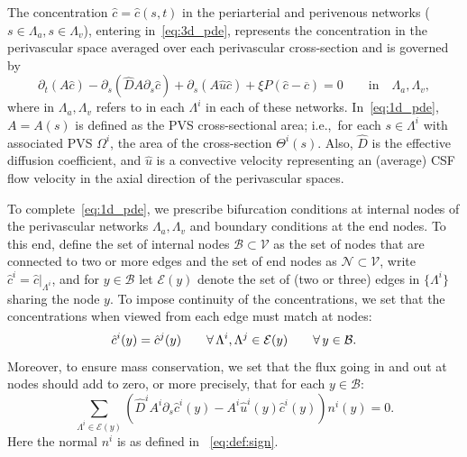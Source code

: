 \documentclass[fleqn,10pt]{wlscirep}
\begin{document}
The concentration $\hat{c} = \hat{c}(s, t)$ in the periarterial and
perivenous networks ($s \in \Lambda_a, s \in \Lambda_v$), entering
in~\eqref{eq:3d_pde}, represents the concentration in the perivascular
space averaged over each perivascular cross-section and is governed by 
\begin{equation}
  \partial_t (A  \hat c) - \partial_s( \hat D A \partial_s \hat c  ) + \partial_s(A \hat u \hat c )  +  \xi P (\hat c - \overline{c}) = 0
  \qquad \text{in} \quad \Lambda_a, \Lambda_v ,
\label{eq:1d_pde}
\end{equation}
where in $\Lambda_a, \Lambda_v$ refers to in each $\Lambda^i$ in each
of these networks. In~\eqref{eq:1d_pde}, $A = A(s)$ is defined as the
PVS cross-sectional area; i.e.,~for each $s \in \Lambda^i$ with
associated PVS $\Omega^i$, the area of the cross-section
$\Theta^i(s)$. Also, $\hat{D}$ is the effective diffusion coefficient,
and $\hat{u}$ is a convective velocity representing an (average) CSF
flow velocity in the axial direction of the perivascular spaces.

To complete~\eqref{eq:1d_pde}, we prescribe bifurcation conditions at
internal nodes of the perivascular networks $\Lambda_a, \Lambda_v$ and
boundary conditions at the end nodes. To this end, define the set of
internal nodes $\mathcal{B} \subset \mathcal{V}$ as the set of nodes
that are connected to two or more edges and the set of end nodes as
$\mathcal{N} \subset \mathcal{V}$, write $\hat{c}^i =
\hat{c}|_{\Lambda^i}$, and for $y\in\mathcal{B}$ let $\mathcal{E}(y)$ denote the set of
(two or three) edges in $\{\Lambda^i\}$ sharing the node $y$. To
impose continuity of the concentrations, we set that the
concentrations when viewed from each edge must match at nodes:
\begin{equation}
  \hat{c}^i (y) = \hat{c}^j(y)
  \qquad \forall \, \Lambda^i, \Lambda^j \in \mathcal{E}(y)
  \qquad \forall \, y \in \mathcal{B} .
  \label{eq:conc_continuity}
\end{equation}
Moreover, to ensure mass conservation, we set that the flux
going in and out at nodes should add to zero, or more precisely, that
for each $y \in \mathcal{B}$:
\begin{equation}
  \sum_{\Lambda^i \in \mathcal{E}(y)}
  \left (\hat{D}^i A^i \partial_s \hat{c}^i (y) - A^i \hat u^i(y) \hat{c}^i(y) \right ) n^i(y)
  = 0.
  \label{eq:flux_conservation}
\end{equation}
Here the normal $n^i$ is as defined in ~\eqref{eq:def:sign}.
\end{document}
